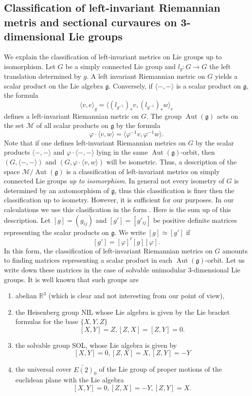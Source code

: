 \documentclass[12pt]{article}
\begin{document}
\subsection{Classification of left-invariant Riemannian metris and sectional curvaures on 3-dimensional Lie groups}
We explain the classification of left-invariant metrics on Lie groups up to isomorphism. Let $G$ be a simply connected Lie group and $l_g: G\rightarrow G$ the left translation determined by $g$. A left invariant Riemannian metric on $G$ yields a scalar product on the Lie algebra $\mathfrak{g}$. Conversely, if $\langle -,-\rangle$ is a scalar product on $\mathfrak{g}$, the formula
$$\langle v,e\rangle_g=\langle (l_{g^{-1}})_*v,(l_{g^{-1}})_*w\rangle_e$$ 
defines a left-invariant Riemannian metric on $G$. The group $\operatorname{Aut}(\mathfrak{g})$ acts on the set $\mathcal{M}$ of all scalar products on $\mathfrak{g}$ by the formula
$$\varphi\cdot\langle v,w\rangle=\langle\varphi^{-1}v,\varphi^{-1}w\rangle.$$
Note that if one defines left-invariant Riemannian metrics on $G$ by the scalar products $\langle -,-\rangle$ and $\varphi\cdot\langle -,-\rangle$  lying in the same $\operatorname{Aut}(\mathfrak{g})$-orbit, then $(G,\langle -,-\rangle)$ and $(G,\varphi\cdot\langle v,w\rangle)$ will be isometric. Thus, a description of the space $\mathcal{M}/\operatorname{Aut}(\mathfrak{g})$ is a classification of left-invariant metrics on simply connected Lie groups {\it up to isomorphism}. In general not every isometry of $G$ is determined by an automorphism of $\mathfrak{g}$, thus this classification is finer then the classification up to isometry. However, it is  sufficient for our purposes. In our calculations we use this clasification in the form \cite{KHL}. Here is the sum up of this description. Let $[g]=(g_{ij})$ and $[g']=[g'_{ij}]$ be positive definite matrices representing the scalar products on $\mathfrak{g}$. We write $[g]\simeq [g']$ if 
$$[g']=[\varphi]^t[g][\varphi].$$
In this form, the classification of left-invariant Riemannian metrics on $G$ amounts to finding matrices representing a scalar product in each $\operatorname{Aut}(\mathfrak{g})$-orbit. Let us write down these matrices in the case of solvable unimodular 3-dimensional Lie groups.
It is well known that such groups are
\begin{enumerate}
\item abelian $\mathbb{R}^3$ (which is clear and not interesting from our point of view),
\item the Heisenberg group NIL whose Lie algebra is given by the Lie bracket formulas for the base $\{X,Y,Z\}$
$$[X,Y]=Z,[Z,X]=[Z,Y]=0.$$
\item the solvable group SOL, whose Lie algebra is given by
$$[X,Y]=0,[Z,X]=X,[Z,Y]=-Y$$
\item the universal cover  $\widetilde{E(2)}_0$ of the Lie group of proper motions of the euclidean plane  with the Lie algebra
$$[X,Y]=0,[Z,X]=-Y,[Z,Y]=X.$$

\end{enumerate}
\end{document}
